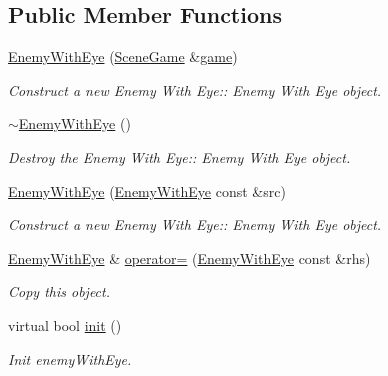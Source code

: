\subsection*{Public Member Functions}
\begin{DoxyCompactItemize}
\item 
\hyperlink{class_enemy_with_eye_a552b889b45b9def904bc94451e21467e}{Enemy\+With\+Eye} (\hyperlink{class_scene_game}{Scene\+Game} \&\hyperlink{class_a_entity_aa2c05db944a8b7487eb8470dd20211ab}{game})
\begin{DoxyCompactList}\small\item\em Construct a new Enemy With Eye\+:\+: Enemy With Eye object. \end{DoxyCompactList}\item 
\mbox{\label{class_enemy_with_eye_a3827f8f91d9aa7a68e2b1321efa55bb2}} 
\hyperlink{class_enemy_with_eye_a3827f8f91d9aa7a68e2b1321efa55bb2}{$\sim$\+Enemy\+With\+Eye} ()
\begin{DoxyCompactList}\small\item\em Destroy the Enemy With Eye\+:\+: Enemy With Eye object. \end{DoxyCompactList}\item 
\hyperlink{class_enemy_with_eye_aa128a0204cd6f03796a00d35d071913b}{Enemy\+With\+Eye} (\hyperlink{class_enemy_with_eye}{Enemy\+With\+Eye} const \&src)
\begin{DoxyCompactList}\small\item\em Construct a new Enemy With Eye\+:\+: Enemy With Eye object. \end{DoxyCompactList}\item 
\hyperlink{class_enemy_with_eye}{Enemy\+With\+Eye} \& \hyperlink{class_enemy_with_eye_a6ae7fb8ee61d5c6b0bf5eb3e919ac018}{operator=} (\hyperlink{class_enemy_with_eye}{Enemy\+With\+Eye} const \&rhs)
\begin{DoxyCompactList}\small\item\em Copy this object. \end{DoxyCompactList}\item 
virtual bool \hyperlink{class_enemy_with_eye_afe1006e6d3cdba1365bbc29fcc9f71b0}{init} ()
\begin{DoxyCompactList}\small\item\em Init enemy\+With\+Eye. \end{DoxyCompactList}\end{DoxyCompactItemize}
